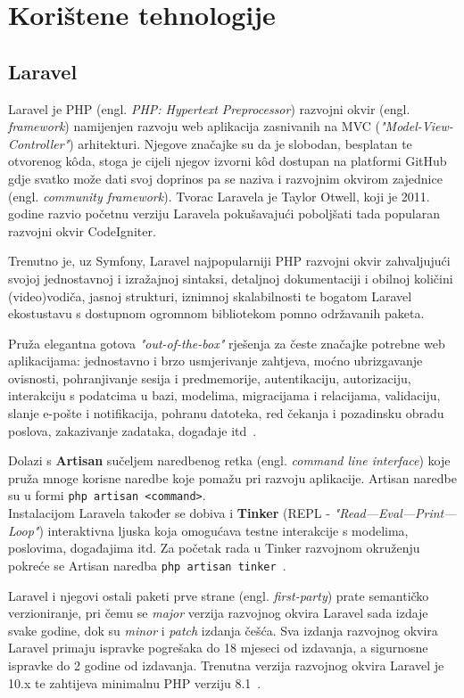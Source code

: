 \section{Korištene tehnologije}

\subsection{Laravel}
Laravel je PHP (engl. \textit{PHP: Hypertext Preprocessor}) razvojni okvir (engl. \textit{framework}) namijenjen razvoju web aplikacija zasnivanih na MVC (\textit{"Model-View-Controller"}) arhitekturi. Njegove značajke su da je slobodan, besplatan te otvorenog k\^oda, stoga je cijeli njegov izvorni k\^od dostupan na platformi GitHub~\cite{laravelGitHub} gdje svatko može dati svoj doprinos pa se naziva i razvojnim okvirom zajednice (engl. \textit{community framework}). Tvorac Laravela je Taylor Otwell, koji je 2011. godine razvio početnu verziju Laravela pokušavajući poboljšati tada popularan razvojni okvir CodeIgniter.

Trenutno je, uz Symfony, Laravel najpopularniji PHP razvojni okvir zahvaljujući svojoj jednostavnoj i izražajnoj sintaksi, detaljnoj dokumentaciji i obilnoj količini (video)vodiča, jasnoj strukturi, iznimnoj skalabilnosti te bogatom Laravel ekostustavu s dostupnom ogromnom bibliotekom pomno održavanih paketa.

Pruža elegantna gotova \textit{"out-of-the-box"} rješenja za česte značajke potrebne web aplikacijama: jednostavno i brzo usmjerivanje zahtjeva, moćno ubrizgavanje ovisnosti, pohranjivanje sesija i predmemorije, autentikaciju, autorizaciju, interakciju s podatcima u bazi, modelima, migracijama i relacijama, validaciju, slanje e-pošte i notifikacija, pohranu datoteka, red čekanja i pozadinsku obradu poslova, zakazivanje zadataka, događaje itd~\cite{laravel}.

Dolazi s \textbf{Artisan} sučeljem naredbenog retka (engl. \textit{command line interface}) koje pruža mnoge korisne naredbe koje pomažu pri razvoju aplikacije. Artisan naredbe su u formi \texttt{php artisan <command>}.\\ 
Instalacijom Laravela također se dobiva i \textbf{Tinker} (REPL - \textit{"Read—Eval—Print—Loop"}) interaktivna ljuska koja omogućava testne interakcije s modelima, poslovima, događajima itd. Za početak rada u Tinker razvojnom okruženju pokreće se Artisan naredba \texttt{php artisan tinker}~\cite{artisanConsole}.

Laravel i njegovi ostali paketi prve strane (engl. \textit{first-party}) prate semantičko verzioniranje, pri čemu se \textit{major} verzija razvojnog okvira Laravel sada izdaje svake godine, dok su \textit{minor} i \textit{patch} izdanja češća. Sva izdanja razvojnog okvira Laravel primaju ispravke pogrešaka do 18 mjeseci od izdavanja, a sigurnosne ispravke do 2 godine od izdavanja.
Trenutna verzija razvojnog okvira Laravel je 10.x te zahtijeva minimalnu PHP verziju 8.1~\cite{releaseNotes}. 
 
